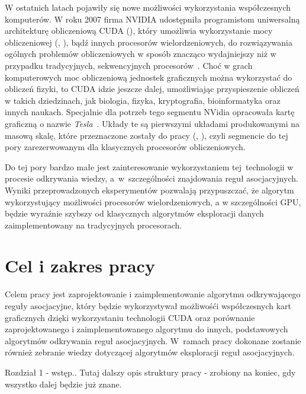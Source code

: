 W ostatnich latach pojawiły się nowe możliwości wykorzystania współczesnych komputerów. W roku 2007 firma NVIDIA udostępniła programistom uniwersalną architekturę obliczeniową CUDA (), który umożliwia wykorzystanie mocy obliczeniowej  (, ), bądź innych procesorów wielordzeniowych, do rozwiązywania ogólnych problemów obliczeniowych w sposób znacząco wydajniejszy niż w przypadku tradycyjnych, sekwencyjnych procesorów~\cite{cuda:zone}. Choć w grach komputerowych moc obliczeniową jednostek graficznych można wykorzystać do obliczeń fizyki, to CUDA idzie jeszcze dalej, umożliwiając przyspieszenie obliczeń w takich dziedzinach, jak biologia, fizyka, kryptografia, bioinformatyka oraz innych naukach. Specjalnie dla potrzeb tego segmentu NVidia opracowała kartę graficzną o nazwie \emph{Tesla}~\cite{cuda:tesla}. Układy te są pierwszymi układami produkowanymi na masową skalę, które przeznaczone zostały do pracy  (, ), czyli segmencie do tej pory zarezerwowanym dla klasycznych procesorów obliczeniowych.

Do tej pory bardzo małe jest zainteresowanie wykorzystaniem tej~technologii w procesie odkrywania wiedzy, a~w~szczególności znajdowania reguł asocjacyjnych. Wyniki przeprowadzonych eksperymentów pozwalają przypuszczać, że algorytm wykorzystujący możliwości procesorów wielordzeniowych, a w szczególności GPU, będzie wyraźnie szybszy od klasycznych algorytmów eksploracji danych zaimplementowany na tradycyjnych procesorach.

\section{Cel i zakres pracy}
Celem pracy jest zaprojektowanie i zaimplementowanie algorytmu odkrywającego reguły asocjacyjne, który będzie wykorzystywał możliwośći współczesnych kart graficznych dzięki wykorzystaniu technologii CUDA oraz porównanie zaprojektowanego i zaimplementowanego algorytmu do innych, podstawowych algorytmów odkrywania reguł asocjacyjnych. W~ramach pracy dokonane zostanie również zebranie wiedzy dotyczącej algorytmów eksploracji reguł asocjacyjnych.

Rozdział 1 - wstęp.. Tutaj dalszy opis struktury pracy - zrobiony na koniec, gdy wszystko dalej będzie już znane.